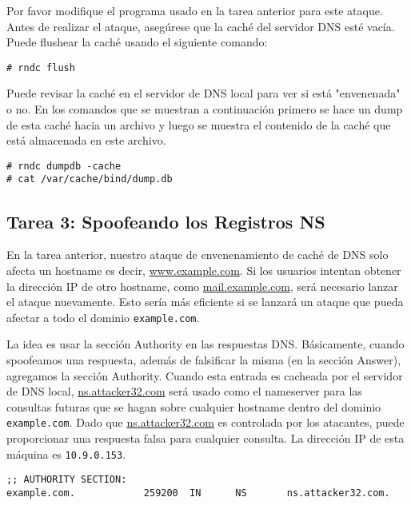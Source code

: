 Por favor modifique el programa usado en la tarea anterior para este ataque.
Antes de realizar el ataque, asegúrese que la caché del servidor DNS esté vacía.
Puede flushear la caché usando el siguiente comando:

\begin{lstlisting}
# rndc flush
\end{lstlisting}

Puede revisar la caché en el servidor de DNS local para ver si está "envenenada" o no. En los comandos que se muestran a continuación primero se hace un dump de esta caché hacia un archivo y luego se muestra el contenido de la caché que está almacenada en este archivo.

\begin{lstlisting}
# rndc dumpdb -cache
# cat /var/cache/bind/dump.db
\end{lstlisting}



\subsection{Tarea 3: Spoofeando los Registros NS}

En la tarea anterior, nuestro ataque de envenenamiento de caché de DNS solo afecta
un hostname es decir, \url{www.example.com}. Si los usuarios intentan obtener la dirección IP de otro hostname, como \url{mail.example.com}, será necesario lanzar el ataque nuevamente. Esto sería más eficiente si se lanzará un ataque que pueda afectar a todo el dominio \texttt{example.com}.

La idea es usar la sección Authority en las respuestas DNS.
Básicamente, cuando spoofeamos una respuesta, además de falsificar la misma (en la sección Answer), agregamos la sección Authority.
Cuando esta entrada es cacheada por el servidor de DNS local, \url{ns.attacker32.com} será usado como el nameserver para las consultas futuras que se hagan sobre cualquier hostname dentro del dominio \texttt{example.com}. Dado que \url{ns.attacker32.com} es controlada por los atacantes, puede proporcionar una respuesta falsa para cualquier consulta. La dirección IP de esta máquina es \texttt{10.9.0.153}.

\begin{lstlisting}
;; AUTHORITY SECTION:
example.com.            259200  IN      NS       ns.attacker32.com.
\end{lstlisting}
 
